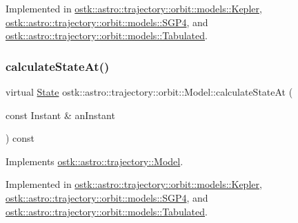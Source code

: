 Implemented in \hyperlink{classostk_1_1astro_1_1trajectory_1_1orbit_1_1models_1_1_kepler_a312fe4296eadcb00799ce9981b0c4f18}{ostk\+::astro\+::trajectory\+::orbit\+::models\+::\+Kepler}, \hyperlink{classostk_1_1astro_1_1trajectory_1_1orbit_1_1models_1_1_s_g_p4_af14e7851024d96eb20033ca9296dc003}{ostk\+::astro\+::trajectory\+::orbit\+::models\+::\+S\+G\+P4}, and \hyperlink{classostk_1_1astro_1_1trajectory_1_1orbit_1_1models_1_1_tabulated_ad7aabd8943ffaa16e569e331bdfa414e}{ostk\+::astro\+::trajectory\+::orbit\+::models\+::\+Tabulated}.

\mbox{\label{classostk_1_1astro_1_1trajectory_1_1orbit_1_1_model_a34a0d8979ec1f7ade3e434fc0dad3711}} 
\subsubsection{\texorpdfstring{calculate\+State\+At()}{calculateStateAt()}}
{\footnotesize\ttfamily virtual \hyperlink{classostk_1_1astro_1_1trajectory_1_1_state}{State} ostk\+::astro\+::trajectory\+::orbit\+::\+Model\+::calculate\+State\+At (\begin{DoxyParamCaption}\item[{const Instant \&}]{an\+Instant }\end{DoxyParamCaption}) const\hspace{0.3cm}{\ttfamily [pure virtual]}}



Implements \hyperlink{classostk_1_1astro_1_1trajectory_1_1_model_ad25eeaded2946bf73d44161b5f4e9a0e}{ostk\+::astro\+::trajectory\+::\+Model}.



Implemented in \hyperlink{classostk_1_1astro_1_1trajectory_1_1orbit_1_1models_1_1_kepler_a4de0c3d7a2b37c1c2ab4d6e207339809}{ostk\+::astro\+::trajectory\+::orbit\+::models\+::\+Kepler}, \hyperlink{classostk_1_1astro_1_1trajectory_1_1orbit_1_1models_1_1_s_g_p4_ad88439d9c46a75d3da8c20d2872271e3}{ostk\+::astro\+::trajectory\+::orbit\+::models\+::\+S\+G\+P4}, and \hyperlink{classostk_1_1astro_1_1trajectory_1_1orbit_1_1models_1_1_tabulated_ad7935cafe71b572b97b9df93e469d2f8}{ostk\+::astro\+::trajectory\+::orbit\+::models\+::\+Tabulated}.

